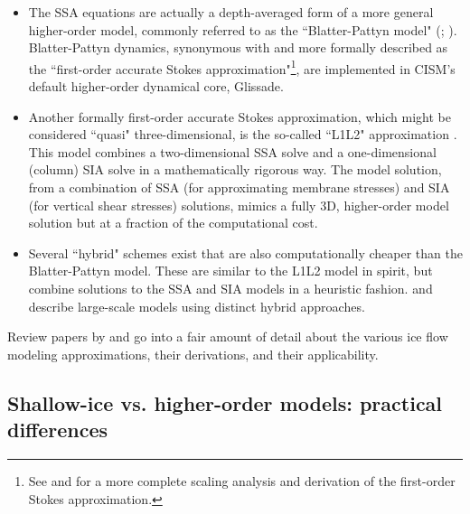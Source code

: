 \begin{itemize}
\item The SSA equations are actually a depth-averaged form of a more general higher-order model, commonly referred to as the ``Blatter-Pattyn model" (\citet{BLATTER:1995wz}; \citet{Pattyn:2003tj}). 
Blatter-Pattyn dynamics, synonymous with and more formally described as the ``first-order accurate Stokes approximation"\footnote{See \citet{Schoof:2010dl} and \citet{DUKOWICZ:2010wb} for a more complete scaling analysis and derivation of the first-order Stokes approximation.}, are implemented in CISM's default higher-order dynamical core, Glissade.
\end{itemize}

\begin{itemize}
\item Another formally first-order accurate Stokes approximation, which might be considered ``quasi" three-dimensional, is the so-called ``L1L2" approximation \citep{Schoof:2010dl}. This model combines a two-dimensional SSA solve and a one-dimensional (column) SIA solve in a mathematically rigorous way. The model solution, from a combination of SSA (for approximating membrane stresses) and SIA (for vertical shear stresses) solutions, mimics a fully 3D, higher-order model solution but at a fraction of the computational cost.
\end{itemize}

\begin{itemize}
\item Several ``hybrid" schemes exist that are also computationally cheaper than the Blatter-Pattyn model. These are similar to the L1L2 model in spirit, but combine solutions to the SSA and SIA models in a heuristic fashion. 
\citet{Bueler:2009ee} and \citet{Pollard:2009ed} describe large-scale models using distinct hybrid approaches. 
\end{itemize}

Review papers by \citet{Schoof:2013is} and \citet{Kirchner2011} go into a fair amount of detail about the various ice flow modeling approximations, their derivations, and their applicability.

\subsection{Shallow-ice vs. higher-order models: practical differences}

